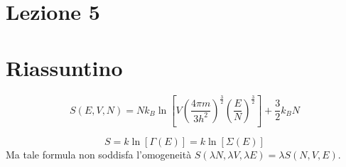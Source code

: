 \documentclass[../MeccanicaStatistica.tex]{subfiles}
\begin{document}
\section{Lezione 5}
\section{Riassuntino}
\begin{equation}
S(E,V,N) = Nk_B \ln\left[V\left(\frac{4\pi m}{3h^2}\right)^\frac{3}{2}\left(\frac{E}{N}\right)^\frac{3}{2}\right]+\frac{3}{2}k_B N
\label{eqn:entropianonestensiva}
\end{equation}

\begin{equation}
S=k\ln\left[\Gamma(E)\right] = k\ln[\Sigma(E)]
\end{equation}
Ma tale formula non soddisfa l'omogeneità $S(\lambda N, \lambda V, \lambda E)=\lambda S(N,V,E)$.\\
\end{document}
